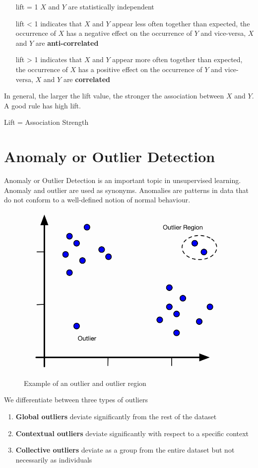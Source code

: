 \documentclass[11pt]{article}
\begin{document}
\begin{itemize}[leftmargin=*, labelindent=3cm, labelsep=1cm]
    \item[lift = 1] $X$ and $Y$ are statistically independent
    \item[lift < 1] indicates that $X$ and $Y$ appear less often together than expected, the occurrence of $X$ has a negative effect on the occurrence of $Y$ and vice-versa, $X$ and $Y$ are \textbf{anti-correlated}
    \item[lift > 1] indicates that $X$ and $Y$ appear more often together than expected, the occurrence of $X$ has a positive effect on the occurrence of $Y$ and vice-versa, $X$ and $Y$ are \textbf{correlated}
\end{itemize}

In general, the larger the lift value, the stronger the association between $X$ and $Y$. A good rule has high lift.

\begin{theorem}
    Lift = Association Strength
\end{theorem}

\section{Anomaly or Outlier Detection}

Anomaly or Outlier Detection is an important topic in unsupervised learning. Anomaly and outlier are used as synonyms. Anomalies are patterns in data that do not conform to a well-defined notion of normal behaviour.

\begin{figure}[tbh!]
    \centering
    \includegraphics[width=0.4\linewidth, keepaspectratio]{Pictures/outlier_examples}
    \caption{Example of an outlier and outlier region}
    \label{fig:outlierexamples}
\end{figure}

We differentiate between three types of outliers

\begin{enumerate}
    \item \textbf{Global outliers} deviate significantly from the rest of the dataset
    \item \textbf{Contextual outliers} deviate significantly with respect to a specific context
    \item \textbf{Collective outliers} deviate as a group from the entire dataset but not necessarily as individuals
\end{enumerate}
\end{document}
